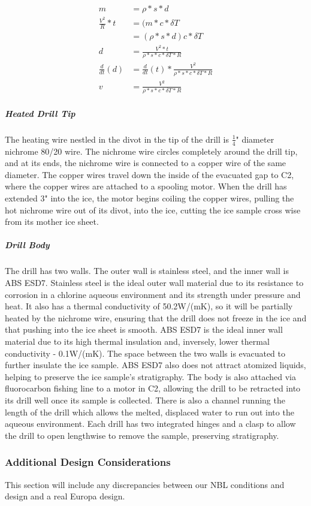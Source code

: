\documentclass{article}
\begin{document}
\begin{align*}
    m &= \rho * s*d \\
    \frac{V^2}{R}*t &= (m*c*\delta T \\
    &= (\rho * s*d) c * \delta T \\
    d &= \frac{V^2 * t}{\rho *s*c*\delta T*R} \\
    \frac{d}{dt}(d) &= \frac{d}{dt}(t)* \frac{V^2}{\rho *s*c*\delta T*R} \\
    v &= \frac{V^2}{\rho *s*c*\delta T*R}
\end{align*}

\subparagraph{Heated Drill Tip}
The heating wire nestled in the divot in the tip of the drill is $\frac{1}{4}$" diameter nichrome 80/20 wire. The nichrome wire circles completely around the drill tip, and at its ends, the nichrome wire is connected to a copper wire of the same diameter. The copper wires travel down the inside of the evacuated gap to C2, where the copper wires are attached to a spooling motor. When the drill has extended 3" into the ice, the motor begins coiling the copper wires, pulling the hot nichrome wire out of its divot, into the ice, cutting the ice sample cross wise from its mother ice sheet.
\subparagraph{Drill Body}
The drill has two walls. The outer wall is stainless steel, and the inner wall is ABS ESD7. Stainless steel is the ideal outer wall material due to its resistance to corrosion in a chlorine aqueous environment and its strength under pressure and heat. It also has a thermal conductivity of 50.2W/(mK), so it will be partially heated by the nichrome wire, ensuring that the drill does not freeze in the ice and that pushing into the ice sheet is smooth. ABS ESD7 is the ideal inner wall material due to its high thermal insulation and, inversely, lower thermal conductivity - 0.1W/(mK). The space between the two walls is evacuated to further insulate the ice sample. ABS ESD7 also does not attract atomized liquids, helping to preserve the ice sample’s stratigraphy. The body is also attached via fluorocarbon fishing line to a motor in C2, allowing the drill to be retracted into its drill well once its sample is collected. There is also a channel running the length of the drill which allows the melted, displaced water to run out into the aqueous environment. Each drill has two integrated hinges and a clasp to allow the drill to open lengthwise to remove the sample, preserving stratigraphy.
\subsubsection{Additional Design Considerations}
This section will include any discrepancies between our NBL conditions and design and a real Europa design.
\end{document}
